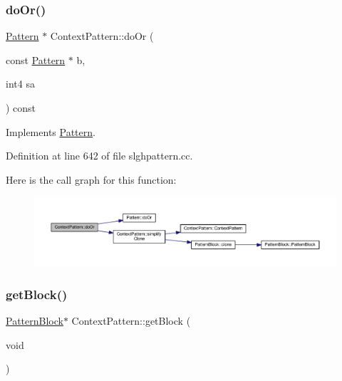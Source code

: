 \subsubsection{\texorpdfstring{doOr()}{doOr()}}
{\footnotesize\ttfamily \mbox{\hyperlink{class_pattern}{Pattern}} $\ast$ Context\+Pattern\+::do\+Or (\begin{DoxyParamCaption}\item[{const \mbox{\hyperlink{class_pattern}{Pattern}} $\ast$}]{b,  }\item[{int4}]{sa }\end{DoxyParamCaption}) const\hspace{0.3cm}{\ttfamily [virtual]}}



Implements \mbox{\hyperlink{class_pattern_a130c23bfea1cb4a1c6e83edf9e2503d3}{Pattern}}.



Definition at line 642 of file slghpattern.\+cc.

Here is the call graph for this function\+:
\nopagebreak
\begin{figure}[H]
\begin{center}
\leavevmode
\includegraphics[width=350pt]{class_context_pattern_aa80ff4baf1fae14a7e5cd744d1409620_cgraph}
\end{center}
\end{figure}
\mbox{\label{class_context_pattern_aed7d47ba0d1e4c2e028f6c04fec131da}} 
\subsubsection{\texorpdfstring{getBlock()}{getBlock()}}
{\footnotesize\ttfamily \mbox{\hyperlink{class_pattern_block}{Pattern\+Block}}$\ast$ Context\+Pattern\+::get\+Block (\begin{DoxyParamCaption}\item[{void}]{ }\end{DoxyParamCaption})\hspace{0.3cm}{\ttfamily [inline]}}



